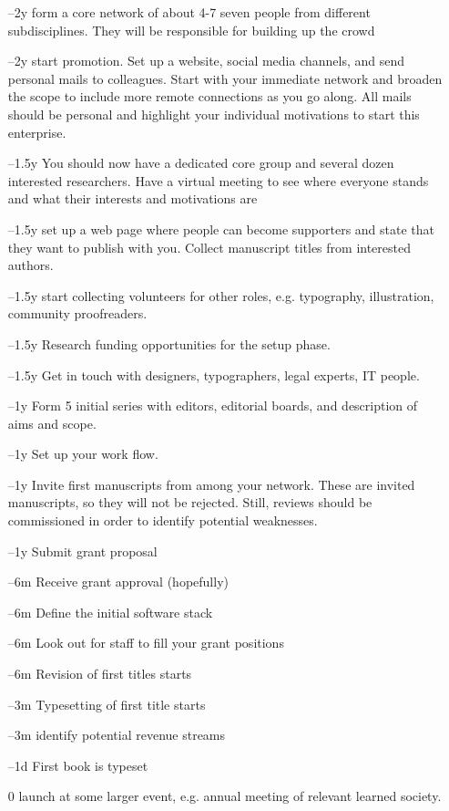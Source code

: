 \documentclass[nonflat,modfonts,output=book] {langsci/langscibook}
\begin{document}
\begin{itemize}
 \item[--2y] form a core network of about 4-7 seven people from different subdisciplines. They will be responsible for building up the crowd 
 \item[--2y] start promotion. Set up a website, social media channels, and send personal mails to colleagues. Start with your immediate network and broaden the scope to include more remote connections as you go along. All mails should be personal and highlight your individual motivations to start this enterprise. 
 \item [--1.5y] You should now have a dedicated core group and several dozen interested researchers. Have a virtual meeting to see where everyone stands and what their interests and motivations are 
 \item[--1.5y] set up a web page where people can become supporters and state that they want to publish with you. Collect manuscript titles from interested authors. 
 \item[--1.5y] start collecting volunteers for other roles, e.g. typography, illustration, community proofreaders. 
 \item [--1.5y] Research funding opportunities for the setup phase.
 \item[--1.5y] Get in touch with designers, typographers, legal experts, IT people.
 \item[--1y] Form 5 initial series with editors, editorial boards, and description of aims and scope.
 \item[--1y] Set up your work flow.
 \item[--1y] Invite first manuscripts from among your network.  These are invited manu\-scripts, so they will not be rejected. Still, reviews should be commissioned in order to identify potential weaknesses.
 \item[--1y] Submit grant proposal 
 \item[--6m] Receive grant approval (hopefully)
 \item[--6m] Define the initial software stack
 \item[--6m] Look out for staff to fill your grant positions
 \item[--6m] Revision of first titles starts
 \item[--3m] Typesetting of first title starts
 \item[--3m] identify potential revenue streams
 \item[--1d] First book is typeset
 \item[0] launch at some larger event, e.g. annual meeting of relevant learned society. 

\end{itemize}
\end{document}
